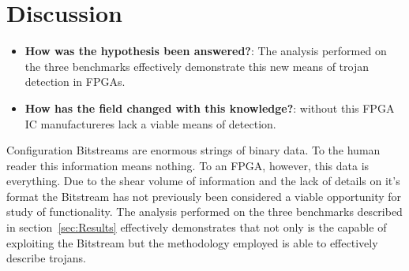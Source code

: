 \section{Discussion}
\begin{itemize}
	\item \textbf{How was the hypothesis been answered?}: The analysis performed on the three benchmarks effectively demonstrate this new means of trojan detection in \acrshort{FPGA}s. 
	\item \textbf{How has the field changed with this knowledge?}: without this FPGA IC manufactureres lack a viable means of detection.
\end{itemize}
Configuration \gls{Bitstream}s are enormous strings of binary data.
To the human reader this information means nothing.
To an \acrshort{FPGA}, however, this data is everything.
Due to the shear volume of information and the lack of details on it's format the \gls{Bitstream} has not previously been considered a viable opportunity for study of functionality.
The analysis performed on the three benchmarks described in section~\ref{sec:Results} effectively demonstrates that not only is the \NameNoPeriod capable of exploiting the \gls{Bitstream} but the methodology employed is able to effectively describe trojans.

